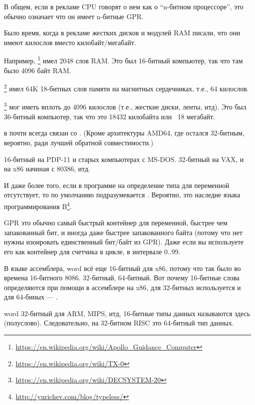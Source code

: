 В общем, если в рекламе CPU говорят о нем как о ``n-битном процессоре'', это обычно означает что он имеет n-битные \ac{GPR}.

Было время, когда в рекламе жестких дисков и модулей \ac{RAM} писали, что они имеют  килослов вместо
 килобайт/мегабайт.

Например, \footnote{\url{https://en.wikipedia.org/wiki/Apollo_Guidance_Computer}}
имел 2048 слов \ac{RAM}.
Это был 16-битный компьютер, так что там было 4096 байт \ac{RAM}.

\footnote{\url{https://en.wikipedia.org/wiki/TX-0}} имел 64K 18-битных слов памяти на магнитных сердечниках,
т.е., 64 килослов.

\footnote{\url{https://en.wikipedia.org/wiki/DECSYSTEM-20}}
мог иметь вплоть до 4096 килослов 
(т.е., жесткие диски, ленты, итд).
Это был 36-битный компьютер, так что это 18432 килобайта или ~18 мегабайт.

\myhrule{}

 в \CCpp почти всегда связан со .
(Кроме архитектуры AMD64, где  остался 32-битным, вероятно, ради лучшей обратной совместимости.)

 16-битный на PDP-11 и старых компьютерах с MS-DOS.
 32-битный на VAX, и на x86 начиная с 80386, итд.

И даже более того, если в программе на \CCpp{} определение типа для переменной отсутствует,
то по умолчанию подразумевается .
Вероятно, это наследие языка программирования B\footnote{\url{http://yurichev.com/blog/typeless/}}.

\myhrule{}

\ac{GPR} это обычно самый быстрый контейнер для переменной, быстрее чем запакованный бит, и иногда даже быстрее запакованного
байта (потому что нет нужны изоировать единственный бит/байт из \ac{GPR}).
Даже если вы используете его как контейнер для счетчика в цикле, в интервале 0..99.

\myhrule{}

В языке ассемблера, \gls{word} всё еще 16-битный для x86, потому что так было во времена 16-битного 8086.
 32-битный,  64-битный.
Вот почему 16-битные слова определяются при помощи  в ассемблере на x86, для 32-битных используется 
и для 64-биных --- .

\Gls{word} 32-битный для ARM, MIPS, итд, 16-битные типы данных называются здесь  (полуслово).
Следовательно,  на 32-битном RISC это 64-битный тип данных.

